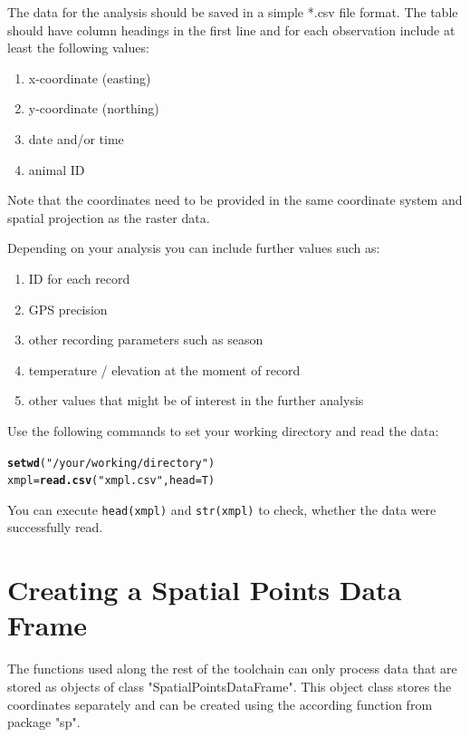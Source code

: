 \documentclass[11pt, a4paper]{article}\usepackage[]{graphicx}\usepackage[]{color}
\makeatletter
\newcommand{\hlstr}[1]{\textcolor[rgb]{0.192,0.494,0.8}{#1}}%
\newcommand{\hlstd}[1]{\textcolor[rgb]{0.345,0.345,0.345}{#1}}%
\newcommand{\hlkwb}[1]{\textcolor[rgb]{0.69,0.353,0.396}{#1}}%
\newcommand{\hlkwc}[1]{\textcolor[rgb]{0.333,0.667,0.333}{#1}}%
\newcommand{\hlkwd}[1]{\textcolor[rgb]{0.737,0.353,0.396}{\textbf{#1}}}%
\newenvironment{kframe}{%
 \def\at@end@of@kframe{}%
 \ifinner\ifhmode%
  \def\at@end@of@kframe{\end{minipage}}%
  \begin{minipage}{\columnwidth}%
 \fi\fi%
 \def\FrameCommand##1{\hskip\@totalleftmargin \hskip-\fboxsep
 \colorbox{shadecolor}{##1}\hskip-\fboxsep
     \hskip-\linewidth \hskip-\@totalleftmargin \hskip\columnwidth}%
 \MakeFramed {\advance\hsize-\width
   \@totalleftmargin\z@ \linewidth\hsize
   \@setminipage}}%
 {\par\unskip\endMakeFramed%
 \at@end@of@kframe}
\newenvironment{knitrout}{}{} %
\makeatother
\begin{document}
The data for the analysis should be saved in a simple *.csv file format. The table should have column headings in the first line and for each observation include at least the following values: 
\begin{enumerate}
\item{x-coordinate (easting)}
\item{y-coordinate (northing)}
\item{date and/or time}
\item{animal ID}
\end{enumerate}

\noindent Note that the coordinates need to be provided in the same coordinate system and spatial projection as the raster data.

Depending on your analysis you can include further values such as:
\begin{enumerate}
\item{ID for each record}
\item{GPS precision}
\item{other recording parameters such as season}
\item{temperature / elevation at the moment of record}
\item{other values that might be of interest in the further analysis}
\end{enumerate}


\noindent Use the following commands to set your working directory and read the data:
\begin{knitrout}
\color{fgcolor}\begin{kframe}
\begin{alltt}
\hlkwd{setwd}\hlstd{(}\hlstr{"/your/working/directory"}\hlstd{)}
\hlstd{xmpl} \hlkwb{=} \hlkwd{read.csv}\hlstd{(}\hlstr{"xmpl.csv"}\hlstd{,} \hlkwc{head}\hlstd{=T)}
\end{alltt}
\end{kframe}
\end{knitrout}

\noindent You can execute \texttt{head(xmpl)} and \texttt{str(xmpl)} to check, whether the data were successfully read.



\section{Creating a Spatial Points Data Frame}%
The functions used along the rest of the toolchain can only process data that are stored as objects of class "SpatialPointsDataFrame". This object class stores the coordinates separately and can be created using the according function from package "sp". 
\end{document}
